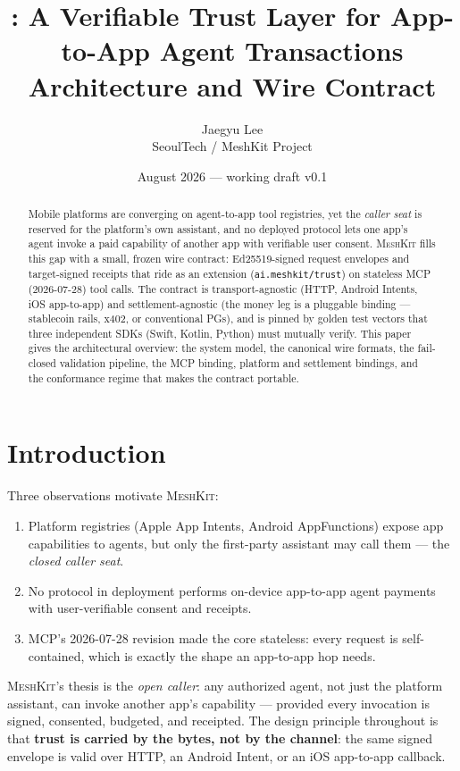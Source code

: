 \documentclass[10pt,twocolumn]{article}
\title{\meshkit: A Verifiable Trust Layer for App-to-App Agent Transactions\\
\large Architecture and Wire Contract}
\author{Jaegyu Lee\\ \small SeoulTech / MeshKit Project}
\date{August 2026 --- working draft v0.1}
\newcommand{\meshkit}{\textsc{MeshKit}}
\newcommand{\field}[1]{\texttt{#1}}
\begin{document}
\maketitle

\begin{abstract}
Mobile platforms are converging on agent-to-app tool registries, yet the
\emph{caller seat} is reserved for the platform's own assistant, and no
deployed protocol lets one app's agent invoke a paid capability of another
app with verifiable user consent. \meshkit{} fills this gap with a small,
frozen wire contract: Ed25519-signed request envelopes and target-signed
receipts that ride as an extension
(\field{ai.meshkit/trust}) on stateless MCP (2026-07-28) tool calls.
The contract is transport-agnostic (HTTP, Android Intents, iOS app-to-app)
and settlement-agnostic (the money leg is a pluggable binding ---
stablecoin rails, x402, or conventional PGs), and is pinned by golden test
vectors that three independent SDKs (Swift, Kotlin, Python) must mutually
verify. This paper gives the architectural overview: the system model, the
canonical wire formats, the fail-closed validation pipeline, the MCP
binding, platform and settlement bindings, and the conformance regime that
makes the contract portable.
\end{abstract}

\section{Introduction}

Three observations motivate \meshkit:
\begin{enumerate}[leftmargin=1.4em,itemsep=1pt]
  \item Platform registries (Apple App Intents, Android AppFunctions)
        expose app capabilities to agents, but only the first-party
        assistant may call them --- the \emph{closed caller seat}.
  \item No protocol in deployment performs on-device app-to-app agent
        payments with user-verifiable consent and receipts.
  \item MCP's 2026-07-28 revision made the core stateless: every request
        is self-contained, which is exactly the shape an app-to-app hop
        needs.
\end{enumerate}

\meshkit's thesis is the \emph{open caller}: any authorized agent, not just
the platform assistant, can invoke another app's capability --- provided
every invocation is signed, consented, budgeted, and receipted. The design
principle throughout is that \textbf{trust is carried by the bytes, not by
the channel}: the same signed envelope is valid over HTTP, an Android
Intent, or an iOS app-to-app callback.
\end{document}
